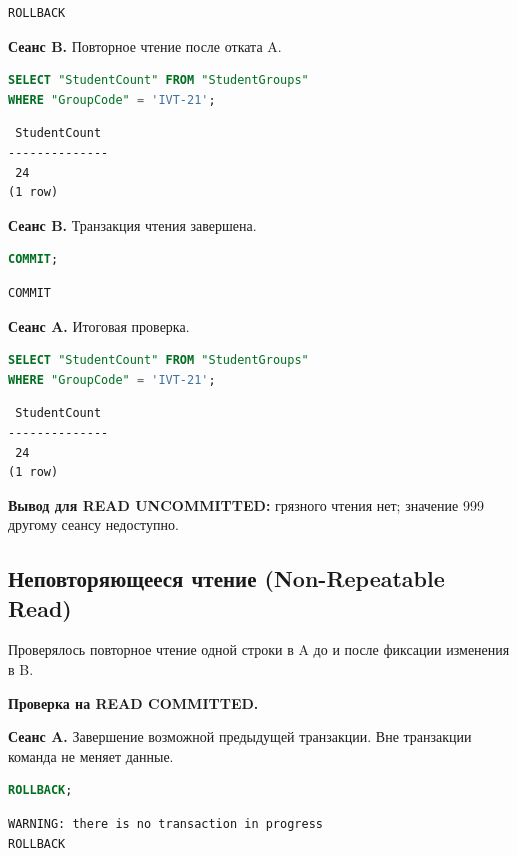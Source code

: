 \documentclass[12pt,a4paper]{article}
\begin{document}
\begin{lstlisting}
ROLLBACK
\end{lstlisting}

\textbf{Сеанс B.} Повторное чтение после отката A.
\begin{lstlisting}[language=SQL]
SELECT "StudentCount" FROM "StudentGroups"
WHERE "GroupCode" = 'IVT-21';
\end{lstlisting}

\begin{lstlisting}
 StudentCount
--------------
 24
(1 row)
\end{lstlisting}

\textbf{Сеанс B.} Транзакция чтения завершена.
\begin{lstlisting}[language=SQL]
COMMIT;
\end{lstlisting}

\begin{lstlisting}
COMMIT
\end{lstlisting}

\textbf{Сеанс A.} Итоговая проверка.
\begin{lstlisting}[language=SQL]
SELECT "StudentCount" FROM "StudentGroups"
WHERE "GroupCode" = 'IVT-21';
\end{lstlisting}

\begin{lstlisting}
 StudentCount
--------------
 24
(1 row)
\end{lstlisting}

\textbf{Вывод для READ UNCOMMITTED:} грязного чтения нет; значение 999 другому сеансу недоступно.

\subsection*{Неповторяющееся чтение (Non-Repeatable Read)}

Проверялось повторное чтение одной строки в A до и после фиксации изменения в B.

\textbf{Проверка на READ COMMITTED.}

\textbf{Сеанс A.} Завершение возможной предыдущей транзакции. Вне транзакции команда не меняет данные.
\begin{lstlisting}[language=SQL]
ROLLBACK;
\end{lstlisting}

\begin{lstlisting}
WARNING: there is no transaction in progress
ROLLBACK
\end{lstlisting}
\end{document}
